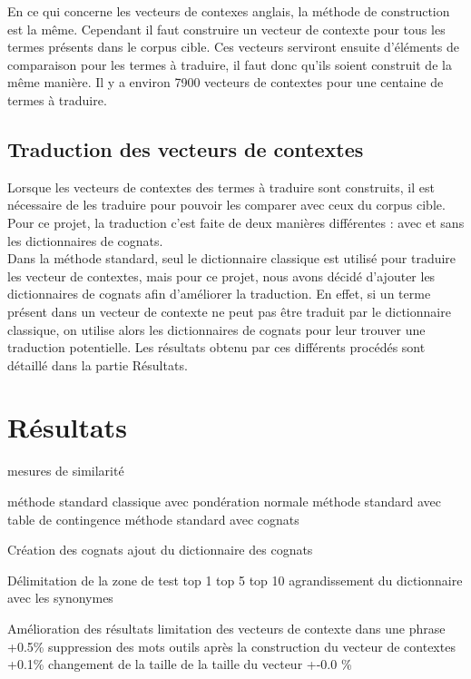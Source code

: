 	En ce qui concerne les vecteurs de contexes anglais, la méthode de construction est la même. Cependant il faut construire un vecteur de contexte pour tous les termes présents dans le corpus cible. Ces vecteurs serviront ensuite d'éléments de comparaison pour les termes à traduire, il faut donc qu'ils soient construit de la même manière. Il y a environ 7900 vecteurs de contextes pour une centaine de termes à traduire.
	
	\subsection{Traduction des vecteurs de contextes}
	
	Lorsque les vecteurs de contextes des termes à traduire sont construits, il est nécessaire de les traduire pour pouvoir les comparer avec ceux du corpus cible. Pour ce projet, la traduction c'est faite de deux manières différentes : avec et sans les dictionnaires de cognats.\\
	
	Dans la méthode standard, seul le dictionnaire classique est utilisé pour traduire les vecteur de contextes, mais pour ce projet, nous avons décidé d'ajouter les dictionnaires de cognats afin d'améliorer la traduction. En effet, si un terme présent dans un vecteur de contexte ne peut pas être traduit par le dictionnaire classique, on utilise alors les dictionnaires de cognats pour leur trouver une traduction potentielle. Les résultats obtenu par ces différents procédés sont détaillé dans la partie Résultats.
	

\section{Résultats}

	mesures de similarité

	méthode standard classique avec pondération normale
	méthode standard avec table de contingence
	méthode standard avec cognats

Création des cognats
ajout du dictionnaire des cognats 


	Délimitation de la zone de test
	top 1
	top 5 
	top 10
	agrandissement du dictionnaire avec les synonymes

Amélioration des résultats
	limitation des vecteurs de contexte dans une phrase +0.5\%
	suppression des mots outils après la construction du vecteur de contextes +0.1\%
	changement de la taille de la taille du vecteur +-0.0 \%
	
